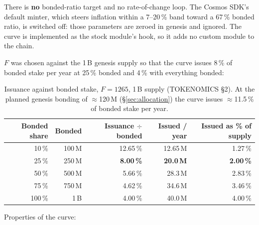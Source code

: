 There is \textbf{no} bonded-ratio target and no rate-of-change loop. The Cosmos
SDK's default minter, which steers inflation within a 7--20\,\% band toward a
67\,\% bonded ratio, is switched off: those parameters are zeroed in genesis and
ignored. The curve is implemented as the stock  module's
 hook, so it adds no custom module to the chain.

$F$ was chosen against the 1\,B \kash{} genesis supply so that the curve
issues 8\,\% of bonded stake per year at 25\,\% bonded and 4\,\% with
everything bonded:

\begin{table}[H]
\centering
\small
\begin{tabular}{@{}rrrrr@{}}
\toprule
Bonded share & Bonded \kash{} & Issuance $\div$ bonded & Issued / year & Issued as \% of supply \\
\midrule
10\,\% & 100\,M & 12.65\,\% & 12.65\,M & 1.27\,\% \\
25\,\% & 250\,M & \textbf{8.00\,\%} & \textbf{20.0\,M} & \textbf{2.00\,\%} \\
50\,\% & 500\,M & 5.66\,\% & 28.3\,M & 2.83\,\% \\
75\,\% & 750\,M & 4.62\,\% & 34.6\,M & 3.46\,\% \\
100\,\% & 1\,B & 4.00\,\% & 40.0\,M & 4.00\,\% \\
\bottomrule
\end{tabular}
\caption{Issuance against bonded stake, $F = 1265$, 1\,B supply
(TOKENOMICS \S2). At the planned genesis bonding of $\approx$120\,M \kash{}
(\S\ref{sec:allocation}) the curve issues $\approx$11.5\,\% of bonded stake
per year.}
\label{tab:issuance}
\end{table}

Properties of the curve:

